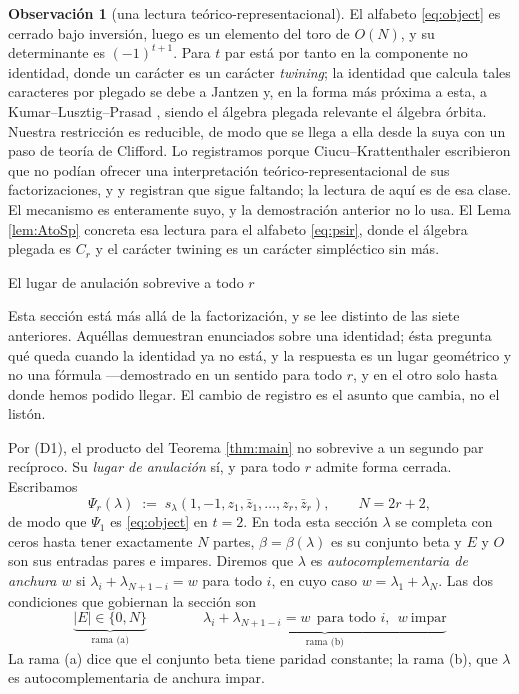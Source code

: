 \documentclass[11pt,reqno]{amsart}
\makeatletter
\renewcommand\section{\@startsection{section}{1}%
  \z@{\linespacing\@plus\linespacing}{.5\linespacing}%
  {\normalfont\large\bfseries\centering}}
\theoremstyle{plain}
\theoremstyle{definition}
\newtheorem{remark}[theorem]{Observación}
\makeatother
\begin{document}
\begin{remark}[una lectura teórico-representacional]\label{rem:twining}
El alfabeto \eqref{eq:object} es cerrado bajo inversión, luego es un elemento del toro de $O(N)$, y
su determinante es $(-1)^{t+1}$. Para $t$ par está por tanto en la componente no identidad, donde un
carácter es un carácter \emph{twining}; la identidad que calcula tales caracteres por plegado se debe
a Jantzen \cite{Jantzen} y, en la forma más próxima a esta, a Kumar--Lusztig--Prasad \cite{KLP},
siendo el álgebra plegada relevante el álgebra órbita. Nuestra restricción es reducible, de modo que
se llega a ella desde la suya con un paso de teoría de Clifford. Lo registramos porque
Ciucu--Krattenthaler \cite{CK09} escribieron que no podían ofrecer una interpretación
teórico-representacional de sus factorizaciones, y \cite{AB19} y \cite{AK25} registran que sigue
faltando; la lectura de aquí es de esa clase. El mecanismo es enteramente suyo, y la demostración
anterior no lo usa. El Lema \ref{lem:AtoSp} concreta esa lectura para el alfabeto \eqref{eq:psir},
donde el álgebra plegada es $C_r$ y el carácter twining es un carácter simpléctico sin más.
\end{remark}

\section{El lugar de anulación sobrevive a todo $r$}\label{sec:zeros}

Esta sección está más allá de la factorización, y se lee distinto de las siete anteriores. Aquéllas
demuestran enunciados sobre una identidad; ésta pregunta qué queda cuando la identidad ya no está, y
la respuesta es un lugar geométrico y no una fórmula ---demostrado en un sentido para todo $r$, y en
el otro solo hasta donde hemos podido llegar. El cambio de registro es el asunto que cambia, no el
listón.

Por (D1), el producto del Teorema \ref{thm:main} no sobrevive a un segundo par recíproco. Su
\emph{lugar de anulación} sí, y para todo $r$ admite forma cerrada. Escribamos
\begin{equation}\label{eq:psir}
\Psi_r(\lambda)\;:=\;s_\lambda(1,-1,z_1,\bar z_1,\dots,z_r,\bar z_r),\qquad N=2r+2,
\end{equation}
de modo que $\Psi_1$ es \eqref{eq:object} en $t=2$. En toda esta sección $\lambda$ se completa con
ceros hasta tener exactamente $N$ partes, $\beta=\beta(\lambda)$ es su conjunto beta y $E$ y $O$ son
sus entradas pares e impares. Diremos que $\lambda$ es \emph{autocomplementaria de anchura $w$} si
$\lambda_i+\lambda_{N+1-i}=w$ para todo $i$, en cuyo caso $w=\lambda_1+\lambda_N$. Las dos
condiciones que gobiernan la sección son
\begin{equation}\label{eq:branches}
\boxed{\;\;
\underbrace{|E|\in\{0,N\}}_{\text{rama (a)}}
\qquad\qquad
\underbrace{\lambda_i+\lambda_{N+1-i}=w\ \ \text{para todo }i,\ \ w\ \text{impar}}_{\text{rama (b)}}
\;\;}
\end{equation}
La rama (a) dice que el conjunto beta tiene paridad constante; la rama (b), que $\lambda$ es
autocomplementaria de anchura impar.
\end{document}
